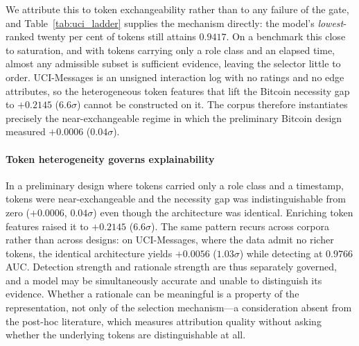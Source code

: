 We attribute this to token exchangeability rather than to any failure of
the gate, and Table~\ref{tab:uci_ladder} supplies the mechanism directly:
the model's \emph{lowest}-ranked twenty per cent of tokens still attains
$0.9417$. On a benchmark this close to saturation, and with tokens carrying
only a role class and an elapsed time, almost any admissible subset is
sufficient evidence, leaving the selector little to order. UCI-Messages is
an unsigned interaction log with no ratings and no edge attributes, so the
heterogeneous token features that lift the Bitcoin necessity gap to
$+0.2145$ ($6.6\sigma$) cannot be constructed on it. The corpus therefore
instantiates precisely the near-exchangeable regime in which the
preliminary Bitcoin design measured $+0.0006$ ($0.04\sigma$).



\paragraph{Token heterogeneity governs explainability}
In a preliminary design where tokens carried only a role class and a
timestamp, tokens were near-exchangeable and the necessity gap was
indistinguishable from zero ($+0.0006$, $0.04\sigma$) even though the
architecture was identical. Enriching token features raised it to
$+0.2145$ ($6.6\sigma$). The same pattern recurs across corpora rather than
across designs: on UCI-Messages, where the data admit no richer tokens, the
identical architecture yields $+0.0056$ ($1.03\sigma$) while detecting at
$0.9766$ AUC. Detection strength and rationale strength are thus separately
governed, and a model may be simultaneously accurate and unable to
distinguish its evidence. Whether a rationale can be meaningful is a
property of the representation, not only of the selection mechanism---a
consideration absent from the post-hoc literature, which measures
attribution quality without asking whether the underlying tokens are
distinguishable at all.



